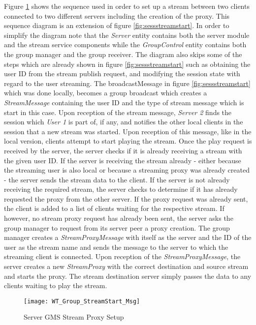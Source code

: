 Figure \ref{fig:groupstreamseq} shows the sequence used in order to set up a stream between two clients connected to two different servers including the creation of the proxy. This sequence diagram is an extension of figure \ref{fig:sessstreamstart}. In order to simplify the diagram note that the \textit{Server} entity contains both the server module and the stream service components while the \textit{GroupControl} entity contains both the group manager and the group receiver. The diagram also skips some of the steps which are already shown in figure \ref{fig:sessstreamstart} such as obtaining the user ID from the stream publish request, and modifying the session state with regard to the user streaming. The broadcastMessage in figure \ref{fig:sessstreamstart} which was done locally, becomes a group broadcast which creates a \textit{StreamMessage} containing the user ID and the type of stream message which is start in this case. Upon reception of the stream message, \textit{Server 2} finds the session which \textit{User 1} is part of, if any, and notifies the other local clients in the session that a new stream was started. Upon reception of this message, like in the local version, clients attempt to start playing the stream. Once the play request is received by the server, the server checks if it is already receiving a stream with the given user ID. If the server is receiving the stream already - either because the streaming user is also local or because a streaming proxy was already created - the server sends the stream data to the client. If the server is not already receiving the required stream, the server checks to determine if it has already requested the proxy from the other server. If the proxy request was already sent, the client is added to a list of clients waiting for the respective stream. If however, no stream proxy request has already been sent, the server asks the group manager to request from its server peer a proxy creation. The group manager creates a \textit{StreamProxyMessage} with itself as the server and the ID of the user as the stream name and sends the message to the server to which the streaming client is connected. Upon reception of the \textit{StreamProxyMessage}, the server creates a new \textit{StreamProxy} with the correct destination and source stream and starts the proxy. The stream destination server simply passes the data to any clients waiting to play the stream.

\begin{figure}
	\centering
	\texttt{[image: WT\_Group\_StreamStart\_Msg]}
	\caption{Server GMS Stream Proxy Setup}
	\label{fig:groupstreamseq}
\end{figure}


